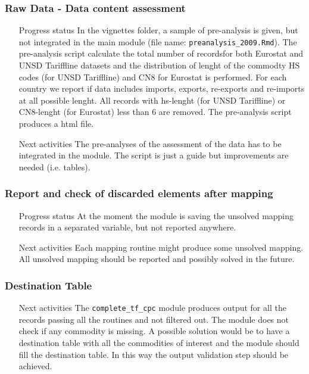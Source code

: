 \documentclass[nojss]{jss}\usepackage[]{graphicx}\usepackage[]{color}
\begin{document}
\subsubsection{Raw Data - Data content assessment}
\begin{itemize}
\item[Progress status] In the vignettes folder, a sample of pre-analysis is given, but not integrated in the main module (file name: {\tt preanalysis\_2009.Rmd}). The pre-analysis script calculate the total number of recordsfor both Eurostat and UNSD Tariffline datasets and the distribution of lenght of the commodty HS codes (for UNSD Tariffline) and CN8 for Eurostat is performed. For each country we report if data includes imports, exports, re-exports and re-imports at all possible lenght. All records with hs-lenght (for UNSD Tariffline) or CN8-lenght (for Eurostat) less than 6 are removed. The pre-analysis script produces a html file.
\item[Next activities] The pre-analyses of the assessment of the data has to be integrated in the module. The script is just a guide but improvements are needed (i.e. tables).
\end{itemize}

\subsubsection{Report and check of discarded elements after mapping}
\begin{itemize}
\item[Progress status] At the moment the module is saving the unsolved mapping records in a separated variable, but not reported anywhere.
\item[Next activities] Each mapping routine might produce some unsolved mapping. All unsolved mapping should be reported and possibly solved in the future.
\end{itemize}

\subsubsection{Destination Table}
\begin{itemize}
\item[Next activities] The {\tt complete\_tf\_cpc} module produces output for all the records passing all the routines and not filtered out. The module does not check if any commodity is missing. A possible solution would be to have a destination table with all the commodities of interest and the module should fill the destination table. In this way the output validation step should be achieved.
\end{itemize}
\end{document}

